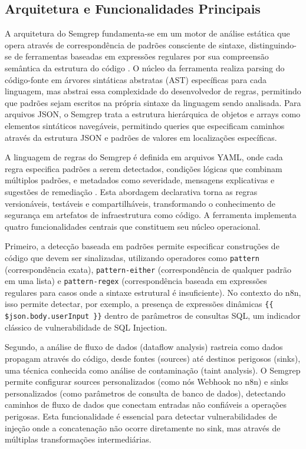 \documentclass{sftex}
\begin{document}
\subsection{Arquitetura e Funcionalidades Principais}

A arquitetura do Semgrep fundamenta-se em um motor de análise estática que opera através de correspondência de padrões consciente de sintaxe, distinguindo-se de ferramentas baseadas em expressões regulares por sua compreensão semântica da estrutura do código \cite{semgrep_platform}. O núcleo da ferramenta realiza parsing do código-fonte em árvores sintáticas abstratas (AST) específicas para cada linguagem, mas abstrai essa complexidade do desenvolvedor de regras, permitindo que padrões sejam escritos na própria sintaxe da linguagem sendo analisada. Para arquivos JSON, o Semgrep trata a estrutura hierárquica de objetos e arrays como elementos sintáticos navegáveis, permitindo queries que especificam caminhos através da estrutura JSON e padrões de valores em localizações específicas.

A linguagem de regras do Semgrep é definida em arquivos YAML, onde cada regra especifica padrões a serem detectados, condições lógicas que combinam múltiplos padrões, e metadados como severidade, mensagens explicativas e sugestões de remediação \cite{semgrep_custom_rules}. Esta abordagem declarativa torna as regras versionáveis, testáveis e compartilháveis, transformando o conhecimento de segurança em artefatos de infraestrutura como código. A ferramenta implementa quatro funcionalidades centrais que constituem seu núcleo operacional.

Primeiro, a detecção baseada em padrões permite especificar construções de código que devem ser sinalizadas, utilizando operadores como \texttt{pattern} (correspondência exata), \texttt{pattern-either} (correspondência de qualquer padrão em uma lista) e \texttt{pattern-regex} (correspondência baseada em expressões regulares para casos onde a sintaxe estrutural é insuficiente). No contexto do n8n, isso permite detectar, por exemplo, a presença de expressões dinâmicas \texttt{\{\{ \$json.body.userInput \}\}} dentro de parâmetros de consultas SQL, um indicador clássico de vulnerabilidade de SQL Injection.

Segundo, a análise de fluxo de dados (dataflow analysis) rastreia como dados propagam através do código, desde fontes (sources) até destinos perigosos (sinks), uma técnica conhecida como análise de contaminação (taint analysis). O Semgrep permite configurar sources personalizados (como nós Webhook no n8n) e sinks personalizados (como parâmetros de consulta de banco de dados), detectando caminhos de fluxo de dados que conectam entradas não confiáveis a operações perigosas. Esta funcionalidade é essencial para detectar vulnerabilidades de injeção onde a concatenação não ocorre diretamente no sink, mas através de múltiplas transformações intermediárias.
\end{document}
